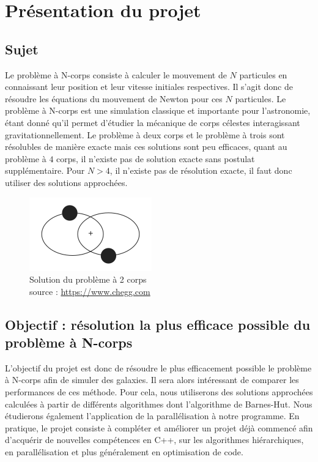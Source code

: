 \chapter{Présentation du projet}
\section{Sujet}
Le problème à N-corps consiste à calculer le mouvement de  $N$ particules en connaissant leur position et leur vitesse initiales respectives.
Il s'agit donc de résoudre les équations du mouvement de Newton pour ces $N$ particules.
Le problème à N-corps est une simulation classique et importante pour l'astronomie, étant donné qu'il permet d'étudier la mécanique de corps célestes interagissant gravitationnellement.
Le problème à deux corps et le problème à trois sont résolubles de manière exacte mais ces solutions sont peu efficaces, quant au problème à $4$ corps, il n'existe pas de solution exacte sans postulat supplémentaire. Pour $N>4$, il n'existe pas de résolution exacte, il faut donc utiliser des solutions approchées.

\begin{figure}[!h]
\begin{center}
\includegraphics[scale=0.8]{presentation/two.png}
\captionsetup{hypcap=false}
\caption{Solution du problème à 2 corps \\
source : \url{https://www.chegg.com}}
\label{fig1}
\end{center}
\end{figure}

\section{Objectif : résolution la plus efficace possible du problème à N-corps}

L'objectif du projet est donc de résoudre le plus efficacement possible le problème à N-corps afin de simuler des galaxies.
Il sera alors intéressant de comparer les performances de ces méthode.
Pour cela, nous utiliserons des solutions approchées calculées à partir de différents algorithmes dont l'algorithme de Barnes-Hut. Nous étudierons également l'application de la parallélisation à notre programme.
En pratique, le projet consiste à compléter et améliorer un projet déjà commencé afin d'acquérir de nouvelles compétences en C++, sur les algorithmes hiérarchiques, en parallélisation et plus généralement en optimisation de code.

